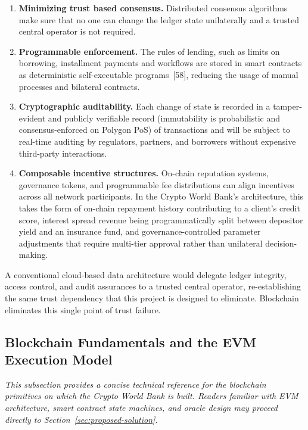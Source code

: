 \documentclass[12pt,a4paper]{report}
\begin{document}
\begin{enumerate}[noitemsep]
\item \textbf{Minimizing trust based consensus.} Distributed consensus algorithms make sure that no one can change the ledger state unilaterally and a trusted central operator is not required.

\item \textbf{Programmable enforcement.} The rules of lending, such as limits on borrowing, installment payments and workflows are stored in smart contracts as deterministic self-executable programs~[58], reducing the usage of manual processes and bilateral contracts.

\item \textbf{Cryptographic auditability.} Each change of state is recorded in a tamper-evident and publicly verifiable record (immutability is probabilistic and consensus-enforced on Polygon PoS) of transactions and will be subject to real-time auditing by regulators, partners, and borrowers without expensive third-party interactions.

\item \textbf{Composable incentive structures.} On-chain reputation systems, governance tokens, and programmable fee distributions can align incentives across all network participants. In the Crypto World Bank's architecture, this takes the form of on-chain repayment history contributing to a client's credit score, interest spread revenue being programmatically split between depositor yield and an insurance fund, and governance-controlled parameter adjustments that require multi-tier approval rather than unilateral decision-making.
\end{enumerate}

A conventional cloud-based data architecture would delegate ledger integrity, access control, and audit assurances to a trusted central operator, re-establishing the same trust dependency that this project is designed to eliminate. Blockchain eliminates this single point of trust failure.

\subsection{Blockchain Fundamentals and the EVM Execution Model}
\label{sec:blockchain-fundamentals}

\noindent\textit{\small This subsection provides a concise technical reference for the blockchain primitives on which the Crypto World Bank is built. Readers familiar with EVM architecture, smart contract state machines, and oracle design may proceed directly to Section~\ref{sec:proposed-solution}.}
\end{document}
